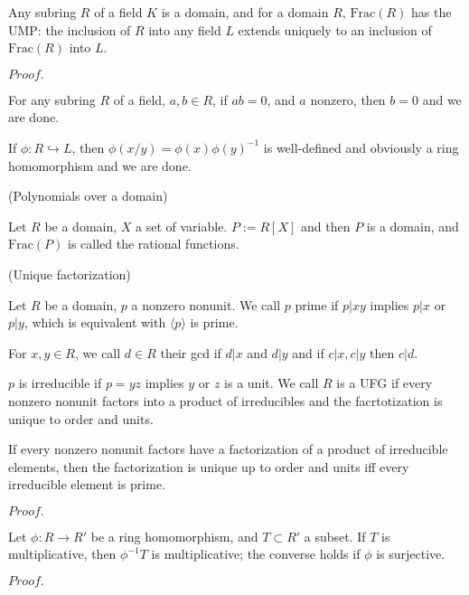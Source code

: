 \documentclass{article}
\newcommand{\Pf}[1]{$Proof.$\par}
\begin{document}
\begin{proposition}
    Any subring $R$ of a field $K$ is a domain, and for a domain $R$, $\text{Frac}(R)$ has the UMP: the inclusion of $R$ into any field $L$ extends uniquely to an inclusion of $\text{Frac}(R)$ into $L$. 
\end{proposition}
\Pf\par
    For any subring $R$ of a field, $a,b\in R$, if $ab=0$, and $a$ nonzero, then $b = 0$ and we are done.\par
    If $\phi:R\hookrightarrow L$, then $\phi(x/y) = \phi(x)\phi(y)^{-1}$ is well-defined and obviously a ring homomorphism and we are done.

\begin{definition}
    (Polynomials over a domain)\par
    Let $R$ be a domain, $X$ a set of variable. $P:=R[X]$ and then $P$ is a domain, and $\text{Frac}(P)$ is called the rational functions.
\end{definition}

\begin{definition}
    (Unique factorization)\par
    Let $R$ be a domain, $p$ a nonzero nonunit. We call $p$ prime if $p|xy$ implies $p|x$ or $p|y$, which is equivalent with $\langle p\rangle$ is prime.\par
    For $x,y\in R$, we call $d\in R$ their gcd if $d|x$ and $d|y$ and if $c|x,c|y$ then $c|d$.\par
    $p$ is irreducible if $p=yz$ implies $y$ or $z$ is a unit. We call $R$ is a UFG if every nonzero nonunit factors into a product of irreducibles and the facrtotization is unique to order and units.
\end{definition}

\begin{proposition}
    If every nonzero nonunit factors have a factorization of a product of irreducible elements, then the factorization is unique up to order and units iff every irreducible element is prime.
\end{proposition}
\Pf\par
    
\begin{lemma}
    Let $\phi:R\to R'$ be a ring homomorphism, and $T\subset R'$ a subset. If $T$ is multiplicative, then $\phi^{-1}T$ is multiplicative; the converse holds if $\phi$ is surjective.
\end{lemma}
\Pf\par
\end{document}
